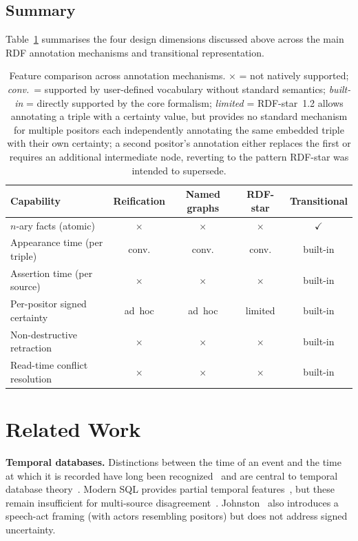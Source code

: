 \documentclass[a4paper,fleqn]{cas-sc}
\begin{document}
\subsection{Summary}
Table~\ref{Table:rdfcomparison} summarises the four design dimensions discussed above across the main RDF annotation mechanisms and transitional representation.

\begin{table}[pos=htbp]
\centering
\small
\begin{tabular}{l c c c c}
\toprule
Capability & Reification & Named graphs & RDF-star & Transitional \\
\midrule
$n$-ary facts (atomic)        & $\times$ & $\times$ & $\times$ & $\checkmark$ \\
Appearance time (per triple)  & conv.    & conv.    & conv.    & built-in \\
Assertion time (per source)   & $\times$ & $\times$ & $\times$ & built-in \\
Per-positor signed certainty  & ad~hoc   & ad~hoc   & limited  & built-in \\
Non-destructive retraction    & $\times$ & $\times$ & $\times$ & built-in \\
Read-time conflict resolution & $\times$ & $\times$ & $\times$ & built-in \\
\bottomrule
\end{tabular}
\caption{Feature comparison across annotation mechanisms.
$\times$ = not natively supported;
\emph{conv.}\ = supported by user-defined vocabulary without standard semantics;
\emph{built-in} = directly supported by the core formalism;
\emph{limited} = RDF-star~1.2 allows annotating a triple with a certainty value, but provides no standard mechanism for multiple positors each independently annotating the same embedded triple with their own certainty; a second positor's annotation either replaces the first or requires an additional intermediate node, reverting to the pattern RDF-star was intended to supersede.}
\label{Table:rdfcomparison}
\end{table}

\section{Related Work}

\textbf{Temporal databases.}
Distinctions between the time of an event and the time at which it is recorded have long been recognized~\cite{Reichenbach} and are central to temporal database theory~\cite{Snodgrass}. Modern SQL provides partial temporal features~\cite{SQL2011}, but these remain insufficient for multi-source disagreement~\cite{GolfarelliRizzi,Johnston}. Johnston~\cite{Johnston} also introduces a speech-act framing (with actors resembling positors) but does not address signed uncertainty.
\end{document}
